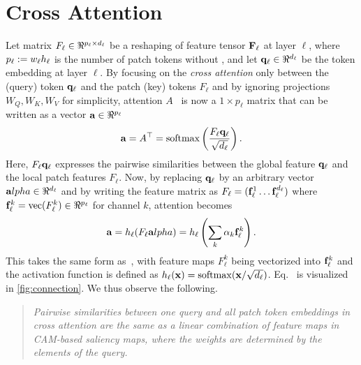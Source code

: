 \section {Cross Attention}
\label{sec:ca_defn}


Let matrix $F_\ell \in \real^{p_\ell \times d_\ell}$ be a reshaping of feature tensor $\mathbf{F}_\ell$ at layer $\ell$, where $p_\ell \mathrel{:=} w_\ell h_\ell$ is the number of patch tokens without \cls, and let $\vq_\ell \in \real^{d_\ell}$ be the \cls token embedding at layer $\ell$. By focusing on the \emph{cross attention} only between the \cls (query) token $\mathbf{q}_\ell$ and the patch (key) tokens $F_\ell$ and by ignoring projections $W_Q, W_K, W_V$ for simplicity, attention $A$~ is now a $1 \times p_\ell$ matrix that can be written as a vector $\mathbf{a} \in \real^{p_\ell}$
\begin{equation}
	\mathbf{a} = A^\top = \operatorname{softmax} \left( \frac{F_\ell \mathbf{q}_\ell}{\sqrt{d_\ell}} \right).
\label{eq:cross-attention}
\end{equation}
Here, $F_\ell \mathbf{q}_\ell$ expresses the pairwise similarities between the global \cls feature $\mathbf{q}_\ell$ and the local patch features $F_\ell$. Now, by replacing $\mathbf{q}_\ell$ by an arbitrary vector $\mathbf{a}lpha \in \real^{d_\ell}$ and by writing the feature matrix as $F_\ell = (\mathbf{f}_\ell^1 \dots \mathbf{f}_\ell^{d_\ell})$ where $\vf_\ell^k = \vect(F_\ell^k) \in \real^{p_\ell}$ for channel $k$, attention  becomes
\begin{equation}
	\mathbf{a} = h_\ell (F_\ell \mathbf{a}lpha) =
		h_\ell \left( \sum_k \alpha_k \mathbf{f}_\ell^k \right).
\label{eq:connection}
\end{equation}
This takes the same form as~, with feature maps $F_\ell^k$ being vectorized into $\mathbf{f}_\ell^k$ and the activation function is defined as $h_\ell(\mathbf{x}) = \operatorname{softmax}(\mathbf{x} / \sqrt{d_\ell})$. Eq.~ is visualized in \autoref{fig:connection}. We thus observe the following.

\begin{quote}
	\emph{Pairwise similarities between one query and all patch token embeddings in cross attention are the same as a linear combination of feature maps in CAM-based saliency maps, where the weights are determined by the elements of the query.}
\end{quote}

